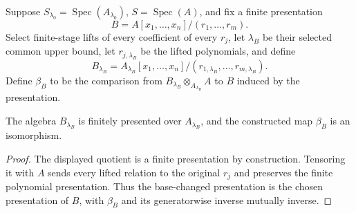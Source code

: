 \begin{definition}
  \label{def:nagata-affine-fp-descent}

  Suppose $S_{\lambda_0}=\operatorname{Spec}(A_{\lambda_0})$,
  $S=\operatorname{Spec}(A)$, and fix a finite presentation
  \[
    B=A[x_1,\ldots,x_n]/(r_1,\ldots,r_m).
  \]
  Select finite-stage lifts of every coefficient of every $r_j$, let
  $\lambda_B$ be their selected common upper bound, let
  $r_{j,\lambda_B}$ be the lifted polynomials, and define
  \[
    B_{\lambda_B}
      =A_{\lambda_B}[x_1,\ldots,x_n]/
        (r_{1,\lambda_B},\ldots,r_{m,\lambda_B}).
  \]
  Define $\beta_B$ to be the comparison from
  $B_{\lambda_B}\otimes_{A_{\lambda_B}}A$ to $B$ induced by the presentation.
\end{definition}

\begin{lemma}
  \label{lemma:nagata-affine-fp-descends}

  The algebra $B_{\lambda_B}$ is finitely presented over
  $A_{\lambda_B}$, and the constructed map $\beta_B$ is an isomorphism.
\end{lemma}

\begin{proof}
  The displayed quotient is a finite presentation by construction.  Tensoring
  it with $A$ sends every lifted relation to the original $r_j$ and preserves
  the finite polynomial presentation.  Thus the base-changed presentation is
  the chosen presentation of $B$, with $\beta_B$ and its generatorwise inverse
  mutually inverse.
\end{proof}

